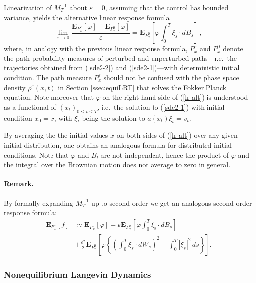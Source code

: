 \documentclass[]{tMPH2e}
\newcommand{\eps}{\varepsilon}
\newcommand{\bE}{{\mathbf E}}
\begin{document}
Linearization of $M_{T}^{-1}$ about $\eps=0$, assuming that the control has bounded variance, yields the alternative linear response formula 
\begin{equation}\label{lr-alt}
\lim_{\eps\to 0}\frac{\bE_{P_{x}^{\eps}}[\varphi] - \bE_{P_{x}^{0}}[\varphi]}{\eps} = \bE_{P_{x}^{0}}\left[\varphi \int_{0}^{T}\xi_{s}\cdot dB_{s} \right]\,,
\end{equation}
where, in analogy with the previous linear response formula, $P_{x}^{\eps}$ and $P_{x}^{0}$ denote the path probability measures of perturbed and unperturbed paths---i.e.~the trajectories obtained from (\ref{sde2-2}) and (\ref{sde2-1})---with deterministic initial condition. The path measure $P^{\eps}_{x}$ should not be confused with the phase space density $\rho^{\eps}(x,t)$ in Section \ref{ssec:equiLRT} that solves the Fokker Planck equation. Note moreover that $\varphi$ on the right hand side of (\ref{lr-alt}) is understood as a functional of $(x_{t})_{0\le t\le T}$, i.e.~the solution to (\ref{sde2-1}) with initial condition $x_{0}=x$, with $\xi_{t}$ being the solution to $a(x_{t})\xi_{t}=v_{t}$. 

By averaging the the initial values $x$ on both sides of (\ref{lr-alt}) over any given initial distribution, one obtains an analogous formula for distributed initial conditions. Note that $\varphi$ and $B_{t}$ are not independent, hence the product of $\varphi$ and the integral over the Brownian motion does not average to zero in general. 


\paragraph*{Remark.} 
By formally expanding $M^{-1}_T$ up to second order we get an analogous second order response formula: 
\begin{equation}\label{2nd}
\begin{aligned}
\bE_{P_{x}^{\eps}}[f] & \approx \bE_{P_{x}^{0}}[\varphi]  + \eps \bE_{P_{x}^{0}}\left[\varphi\int_{0}^{T}\xi_{s}\cdot dB_{s} \right]\\  
& + \frac{\eps^{2}}{2} \bE_{P_{x}^{0}}\left[\varphi\left\{\left(\int_{0}^{T}\xi_{s}\cdot dW_{s}\right)^2 -\int_0^T |\xi_s|^2\,ds\right\} \right].
\end{aligned}
\end{equation}


 
 

\subsubsection*{Nonequilibrium Langevin Dynamics}
\end{document}
